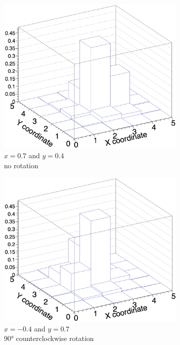 \documentclass{article}
\begin{document}
\begin{figure}[H]
\centering
\begin{subfigure}{.5\textwidth}
  \centering
  \includegraphics[width=.9\linewidth]{images/q1.png}
  \caption{$x=0.7$ and $y=0.4$\\no rotation}
  \label{fig:q1}
\end{subfigure}%
\begin{subfigure}{.5\textwidth}
  \centering
  \includegraphics[width=.9\linewidth]{images/q2.png}
  \caption{$x=-0.4$ and $y=0.7$\\90° counterclockwise rotation}
  \label{fig:q2}
\end{subfigure}
\begin{subfigure}{.5\textwidth}

\end{subfigure}
\end{figure}
\end{document}
